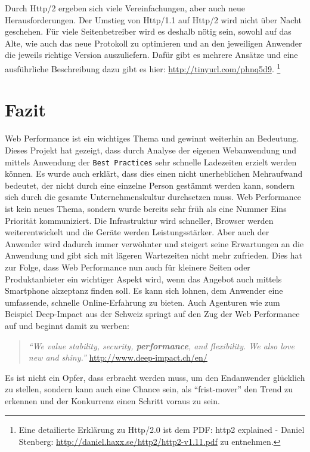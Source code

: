 			Durch Http/2 ergeben sich viele Vereinfachungen, aber auch neue Herausforderungen. Der Umstieg von Http/1.1 auf Http/2 wird nicht über Nacht geschehen. Für viele Seitenbetreiber wird es deshalb nötig sein, sowohl auf das Alte, wie auch das neue Protokoll zu optimieren und an den jeweiligen Anwender die jeweils richtige Version auszuliefern. Dafür gibt es mehrere Ansätze und eine ausführliche Beschreibung dazu gibt es hier: \url{http://tinyurl.com/phnq5d9}. \footnote{Eine detailierte Erklärung zu Http/2.0 ist dem PDF: http2 explained - Daniel Stenberg: \url{http://daniel.haxx.se/http2/http2-v1.11.pdf} zu entnehmen.}



\pagebreak
%
%


\section{Fazit} %
\label{sec:fazit}
	Web Performance ist ein wichtiges Thema und gewinnt weiterhin an Bedeutung. Dieses Projekt hat gezeigt, dass durch Analyse der eigenen Webanwendung und mittels Anwendung der \texttt{Best Practices} sehr schnelle Ladezeiten erzielt werden können. Es wurde auch erklärt, dass dies einen nicht unerheblichen Mehraufwand bedeutet, der nicht durch eine einzelne Person gestämmt werden kann, sondern sich durch die gesamte Unternehmenskultur durchsetzen muss. Web Performance ist kein neues Thema, sondern wurde bereits sehr früh als eine Nummer Eins Priorität kommuniziert. Die Infrastruktur wird schneller, Browser werden weiterentwickelt und die Geräte werden Leistungsstärker. Aber auch der Anwender wird dadurch immer verwöhnter und steigert seine Erwartungen an die Anwendung und gibt sich mit lägeren Wartezeiten nicht mehr zufrieden. Dies hat zur Folge, dass Web Performance nun auch für kleinere Seiten oder Produktanbieter ein wichtiger Aspekt wird, wenn das Angebot auch mittels Smartphone akzeptanz finden soll. Es kann sich lohnen, dem Anwender eine umfassende, schnelle Online-Erfahrung zu bieten. Auch Agenturen wie zum Beispiel Deep-Impact aus der Schweiz springt auf den Zug der Web Performance auf und beginnt damit zu werben:

	\begin{quote}
		\textit{"`We value stability, security, \textbf{performance}, and flexibility. We also love new and shiny."'} \url{http://www.deep-impact.ch/en/} 
	\end{quote}

	Es ist nicht ein Opfer, dass erbracht werden muss, um den Endanwender glücklich zu stellen, sondern kann auch eine Chance sein, als "`frist-mover"' den Trend zu erkennen und der Konkurrenz einen Schritt voraus zu sein.





